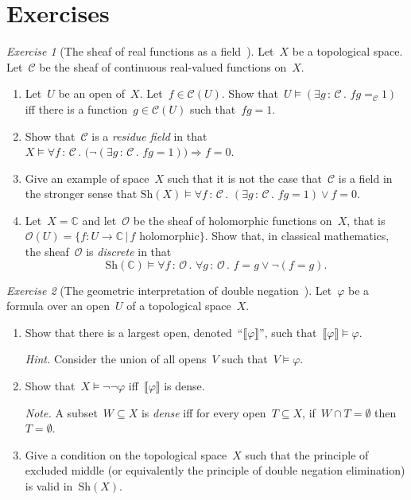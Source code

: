 \documentclass[10pt,reqno,a4paper,openany]{amsbook}
\theoremstyle{definition}
\theoremstyle{plain}
\theoremstyle{remark}
\newcommand{\CCC}{\mathcal{C}}
\newcommand{\OOO}{\mathcal{O}}
\newcommand{\CC}{\mathbb{C}}
\newcommand{\?}{\,{:}\,}
\renewcommand{\_}{\mathpunct{.}\,}
\newtheorem{exercise}{Exercise}[chapter]
\newcommand{\Sh}{\mathrm{Sh}}
\begin{document}
\section{Exercises}

\begin{exercise}[{The sheaf of real functions as a
field~\cite[Exercise~28]{blechschmidt:generalized-spaces}}]
Let~$X$ be a topological space. Let~$\CCC$ be the sheaf of continuous real-valued
functions on~$X$.
\begin{enumerate}
\item Let~$U$ be an open of~$X$. Let~$f \in \CCC(U)$. Show that~$U \models (\exists g\?\CCC\_ fg =_\CCC
1)$ iff there is a function~$g \in \CCC(U)$ such that~$fg = 1$.
\item Show that~$\CCC$ is a \emph{residue field} in that
$X \models \forall f\?\CCC\_
  \bigl(\neg(\exists g\?\CCC\_ fg = 1)\bigr) \Rightarrow f = 0$.
\item Give an example of space~$X$ such that it is not the case that~$\CCC$ is a
field in the stronger sense that
$\Sh(X) \models \forall f\?\CCC\_ (\exists g\?\CCC\_ fg = 1) \vee f = 0$.
\item Let~$X = \CC$ and let~$\OOO$ be the sheaf of holomorphic functions on~$X$,
that is~$\OOO(U) = \{ f : U \to \CC \,|\, \text{$f$ holomorphic} \}$.
Show that, in classical mathematics, the sheaf~$\OOO$ is \emph{discrete} in that
\[ \Sh(\CC) \models \forall f\?\OOO\_ \forall g\?\OOO\_ f = g \vee \neg(f = g).
\]
\end{enumerate}

\end{exercise}
\begin{exercise}[{The geometric interpretation of double
negation~\cite[Exercise~26]{blechschmidt:generalized-spaces}}]
Let~$\varphi$ be a formula over an open~$U$ of a topological space~$X$.
\begin{enumerate}
\item Show that there is a largest open,
denoted~``$\llbracket\varphi\rrbracket$'', such
that~$\llbracket\varphi\rrbracket \models \varphi$.\smallskip

{\noindent\scriptsize\emph{Hint.} Consider the union of all opens~$V$ such that~$V
\models \varphi$.\par}

\item Show that~$X \models \neg\neg\varphi$ iff~$\llbracket\varphi\rrbracket$
is dense.

{\noindent\scriptsize\emph{Note.} A subset~$W \subseteq X$ is \emph{dense} iff
for every open~$T \subseteq X$, if~$W \cap T = \emptyset$ then~$T =
\emptyset$.\par}

\item Give a condition on the topological space~$X$ such that the principle of
excluded middle (or equivalently the principle of double negation elimination)
is valid in~$\Sh(X)$.
\end{enumerate}
\end{exercise}
\end{document}
